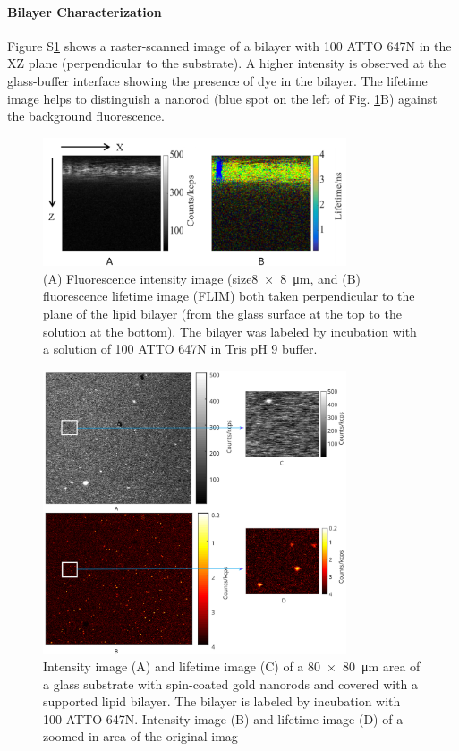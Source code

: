 \paragraph*{Bilayer Characterization}
Figure S\ref{SIfig:xz-scan} shows a raster-scanned image of a bilayer with \SI{100}{\nM} ATTO 647N in the XZ plane (perpendicular to the substrate). 
A higher intensity is observed at the glass-buffer interface showing the presence of dye in the bilayer.
The lifetime image helps to distinguish a nanorod (blue spot on the left of Fig. \ref{SIfig:xz-scan}B) against the background fluorescence.
\begin{figure}
  \centering
  \includegraphics[width=0.8\textwidth]{xz_scan}
  \makeatletter
  \renewcommand{\fnum@figure}{\figurename~S\thefigure}
  \makeatother{}
  \caption{(A) Fluorescence intensity image (size\SI[product-units=repeat]{8x8}{\um}, and (B) fluorescence lifetime image (FLIM) both taken perpendicular to the plane of the lipid bilayer (from the glass surface at the top to the solution at the bottom).
  The bilayer was labeled by incubation with a solution of \SI{100}{\nM} ATTO 647N in Tris pH 9 buffer.}
  \label{SIfig:xz-scan}
\end{figure}

\begin{figure}
  \centering
  \includegraphics[width=0.8\textwidth]{xy_with_zoom}
  \makeatletter
  \renewcommand{\fnum@figure}{\figurename~S\thefigure}
  \makeatother{}
  \caption{ Intensity image (A) and lifetime image (C) of a \SI[product-units=repeat]{80x80}{\um} area of a glass substrate with spin-coated gold nanorods and covered with a supported lipid bilayer.
  The bilayer is labeled by incubation with \SI{100}{\nM} ATTO 647N.
  Intensity image (B) and lifetime image (D) of a zoomed-in area of the original imag}
  \label{SIfig:xy-scan}
\end{figure}

